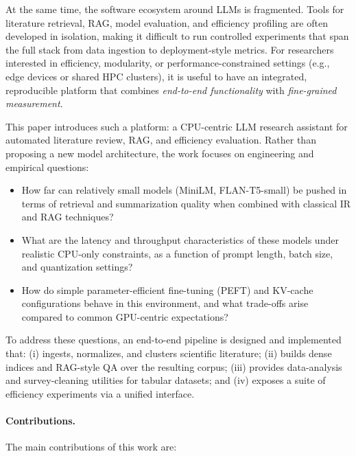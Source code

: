 \documentclass[11pt]{article}
\begin{document}
At the same time, the software ecosystem around LLMs is fragmented. Tools for literature retrieval, RAG, model evaluation, and efficiency profiling are often developed in isolation, making it difficult to run controlled experiments that span the full stack from data ingestion to deployment-style metrics. For researchers interested in efficiency, modularity, or performance-constrained settings (e.g., edge devices or shared HPC clusters), it is useful to have an integrated, reproducible platform that combines \emph{end-to-end functionality} with \emph{fine-grained measurement}.

This paper introduces such a platform: a CPU-centric LLM research assistant for automated literature review, RAG, and efficiency evaluation. Rather than proposing a new model architecture, the work focuses on engineering and empirical questions:

\begin{itemize}[leftmargin=1.5em]
\item How far can relatively small models (MiniLM, FLAN-T5-small) be pushed in terms of retrieval and summarization quality when combined with classical IR and RAG techniques?
\item What are the latency and throughput characteristics of these models under realistic CPU-only constraints, as a function of prompt length, batch size, and quantization settings?
\item How do simple parameter-efficient fine-tuning (PEFT) and KV-cache configurations behave in this environment, and what trade-offs arise compared to common GPU-centric expectations?
\end{itemize}

To address these questions, an end-to-end pipeline is designed and implemented that: (i) ingests, normalizes, and clusters scientific literature; (ii) builds dense indices and RAG-style QA over the resulting corpus; (iii) provides data-analysis and survey-cleaning utilities for tabular datasets; and (iv) exposes a suite of efficiency experiments via a unified interface.

\paragraph{Contributions.}
The main contributions of this work are:
\end{document}
